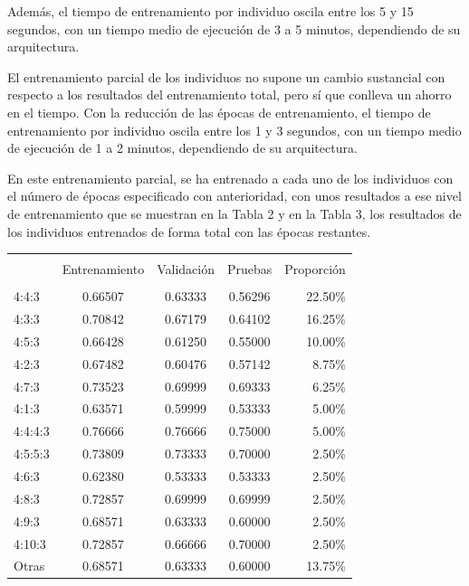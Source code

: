 \documentclass[spanish,a4paper,12pt,twoside]{report}
\begin{document}
  Además, el tiempo de entrenamiento por individuo oscila entre los 5 y 15 segundos, con un tiempo medio de ejecución de 3 a 5 minutos, dependiendo de su arquitectura. \par
  El entrenamiento parcial de los individuos no supone un cambio sustancial con respecto a los resultados del entrenamiento total, pero sí que conlleva un ahorro en el tiempo. Con la reducción de las épocas de entrenamiento, el tiempo de entrenamiento por individuo oscila entre los 1 y 3 segundos, con un tiempo medio de ejecución de 1 a 2 minutos, dependiendo de su arquitectura. \par
  En este entrenamiento parcial, se ha entrenado a cada uno de los individuos con el número de épocas especificado con anterioridad, con unos resultados a ese nivel de entrenamiento que se muestran en la Tabla 2 y en la Tabla 3, los resultados de los individuos entrenados de forma total con las épocas restantes. \par
  \begin{center}
   \label{table}
  \begin{tabular}{l c c c r}
    \hline \\ [-2ex]
    & Entrenamiento & Validación & Pruebas & Proporción \\ [0.5ex]
    \hline \\ [-1ex]
    4:4:3 & 0.66507 & 0.63333 & 0.56296 & 22.50\% \\
    4:3:3 & 0.70842 & 0.67179 & 0.64102 & 16.25\% \\ 
    4:5:3 & 0.66428 & 0.61250 & 0.55000 & 10.00\% \\
    4:2:3 & 0.67482 & 0.60476 & 0.57142 & 8.75\% \\
    4:7:3 & 0.73523 & 0.69999 & 0.69333 & 6.25\% \\ 
    4:1:3 & 0.63571 & 0.59999 & 0.53333 & 5.00\% \\
    4:4:4:3 & 0.76666 & 0.76666 & 0.75000 & 5.00\% \\
    4:5:5:3 & 0.73809 & 0.73333 & 0.70000 & 2.50\% \\
    4:6:3 & 0.62380 & 0.53333 & 0.53333 & 2.50\% \\
    4:8:3 & 0.72857 & 0.69999 & 0.69999 & 2.50\% \\ 
    4:9:3 & 0.68571 & 0.63333 & 0.60000 & 2.50\% \\
    4:10:3 & 0.72857 & 0.66666 & 0.70000 & 2.50\% \\ 
    Otras & 0.68571 & 0.63333 & 0.60000 & 13.75\% \\ [1ex]
    \hline
  \end{tabular}
\end{center} \par
\end{document}
